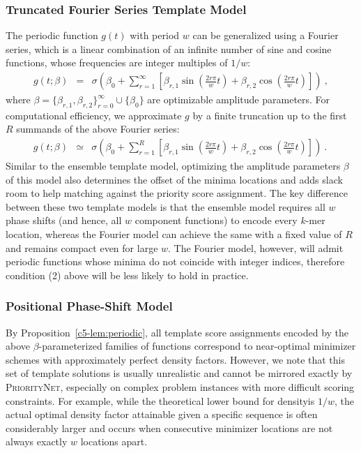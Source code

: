\subsubsection{Truncated Fourier Series Template Model}
\label{sec:fourier}
The periodic function $g(t)$ with period $w$ can be generalized using a Fourier series, which is a linear combination of an infinite number of sine and cosine functions, whose frequencies are integer multiples of $1/w$:
\begin{eqnarray}
g(t; \beta) &=& \sigma\left(\beta_0 + \sum_{r=1}^\infty \left[ \beta_{r,1}\sin\left(\frac{2r\pi}{w}t\right) + \beta_{r,2}\cos\left(\frac{2r\pi}{w}t\right)\right]\right) \ ,
\end{eqnarray}
where $\beta = \{\beta_{r,1}, \beta_{r,2}\}_{r=0}^{\infty} \cup \{\beta_0\}$ are optimizable amplitude parameters. For computational efficiency, we approximate $g$ by a finite truncation up to the first $R$ summands of the above Fourier series:
\begin{eqnarray}
g(t; \beta) &\simeq& \sigma\left(\beta_0 + \sum_{r=1}^R \left[ \beta_{r,1}\sin\left(\frac{2r\pi}{w}t\right) + \beta_{r,2}\cos\left(\frac{2r\pi}{w}t\right)\right]\right) \ .\ 
\end{eqnarray}
Similar to the ensemble template model, optimizing the amplitude parameters $\beta$ of this model also determines the offset of the minima locations and adds slack room to help matching against the priority score assignment. 
\noindent The key difference between these two template models is that the ensemble model requires all $w$ phase shifts (and hence, all $w$ component functions) to encode every $k$-mer location, whereas the Fourier model can achieve the same with a fixed value of $R$ and remains compact even for large $w$. The Fourier model, however, will admit periodic functions whose minima do not coincide with integer indices, therefore condition (2) above will be less likely to hold in practice.

\subsubsection{Positional Phase-Shift Model}
\label{sec:phase}
By Proposition~\ref{c5-lem:periodic}, all template score assignments encoded by the above $\beta$-parameterized families of functions correspond to near-optimal minimizer schemes with approximately perfect density factors. However, we note that this set of template solutions is usually unrealistic and cannot be mirrored exactly by \textsc{PriorityNet}, especially on complex problem instances with more difficult scoring constraints. For example, while the theoretical lower bound for densityis $1/w$, the actual optimal density factor attainable given a specific sequence is often considerably larger and occurs when consecutive minimizer locations are not always exactly $w$ locations apart.

